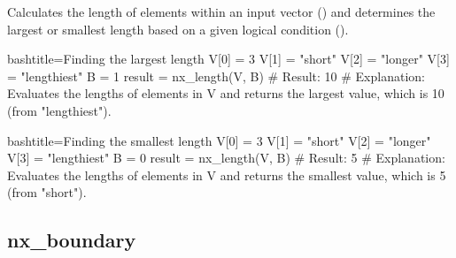 \begin{NexMainBox}
	\begin{NexMainBox}
		Calculates the length of elements within an input vector () and determines the largest or smallest length based on a given logical condition ().
	\end{NexMainBox}
	\begin{NexMainBox}
		\begin{NexListDark}
		\end{NexListDark}
	\end{NexMainBox}
\end{NexMainBox}

\begin{NexCodeBox}{bash}{title={Finding the largest length}}
	V[0] = 3
	V[1] = "short"
	V[2] = "longer"
	V[3] = "lengthiest"
	B = 1
	result = nx_length(V, B)
	# Result: 10
	# Explanation: Evaluates the lengths of elements in V and returns the largest value, which is 10 (from "lengthiest").
\end{NexCodeBox}

\begin{NexCodeBox}{bash}{title={Finding the smallest length}}
	V[0] = 3
	V[1] = "short"
	V[2] = "longer"
	V[3] = "lengthiest"
	B = 0
	result = nx_length(V, B)
	# Result: 5
	# Explanation: Evaluates the lengths of elements in V and returns the smallest value, which is 5 (from "short").
\end{NexCodeBox}

\newpage
\subsection{nx_boundary}
\label{nx_boundary}

